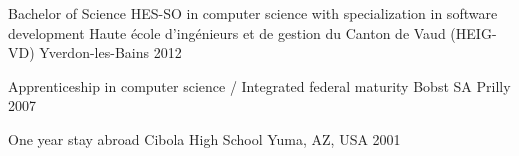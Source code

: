 


\begin{cventries}


\cventry
{Bachelor of Science HES-SO in computer science with specialization in software development} %
{Haute école d'ingénieurs et de gestion du Canton de Vaud (HEIG-VD)} %
{Yverdon-les-Bains} %
{2012} %
 { %
 }


\cventry
{Apprenticeship in computer science / Integrated federal maturity} %
{Bobst SA} %
{Prilly} %
{2007} %
 { %
 }


\cventry
{One year stay abroad} %
{Cibola High School} %
{Yuma, AZ, USA} %
{2001} %
 { %
 }


\end{cventries}
